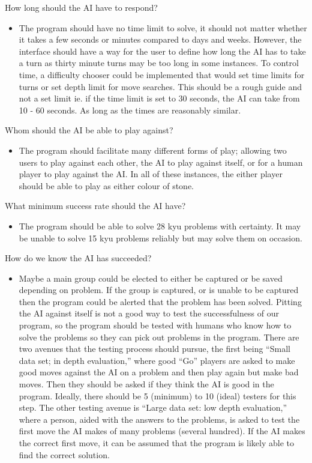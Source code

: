 \documentclass{l3proj}
\begin{document}
How long should the AI have to respond?
\begin{itemize}
\item The program should have no time limit to solve, it should not matter whether it takes a few seconds or minutes compared to days and weeks.  However, the interface should have a way for the user to define how long the AI has to take a turn as thirty minute turns may be too long in some instances.  To control time, a difficulty chooser could be implemented that would set time limits for turns or set depth limit for move searches.  This should be a rough guide and not a set limit ie. if the time limit is set to 30 seconds, the AI can take from 10 - 60 seconds.  As long as the times are reasonably similar.
\end{itemize}
Whom should the AI be able to play against?
\begin{itemize}
\item The program should facilitate many different forms of play; allowing two users to play against each other, the AI to play against itself, or for a human player to play against the AI.  In all of these instances, the either player should be able to play as either colour of stone.
\end{itemize}
What minimum success rate should the AI have?
\begin{itemize}
\item The program should be able to solve 28 kyu problems with certainty.  It may be unable to solve 15 kyu problems reliably but may solve them on occasion.
\end{itemize}
How do we know the AI has succeeded?
\begin{itemize}
\item Maybe a main group could be elected to either be captured or be saved depending on problem.  If the group is captured, or is unable to be captured then the program could be alerted that the problem has been solved.  Pitting the AI against itself is not a good way to test the successfulness of our program, so the program should be tested with humans who know how to solve the problems so they can pick out problems in the program. There are two avenues that the testing process should pursue, the first being “Small data set; in depth evaluation,” where good “Go” players are asked to make good moves against the AI on a problem and then play again but make bad moves. Then they should be asked if they think the AI is good in the program.  Ideally, there should be 5 (minimum) to 10 (ideal) testers for this step.  The other testing avenue is “Large data set: low depth evaluation,” where a person, aided with the answers to the problems, is asked to test the first move the AI makes of many problems (several hundred). If the AI makes the correct first move, it can be assumed that the program is likely able to find the correct solution.
\end{itemize}
\end{document}
